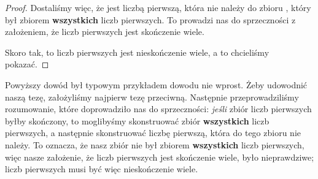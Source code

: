 \begin{example}
\begin{proof}
Dostaliśmy więc, że  jest liczbą pierwszą, która nie należy do zbioru , który był zbiorem \textbf{wszystkich} liczb pierwszych. To prowadzi nas do sprzeczności z założeniem, że liczb pierwszych jest skończenie wiele.

Skoro tak, to liczb pierwszych jest nieskończenie wiele, a to chcieliśmy pokazać.
\end{proof}

Powyższy dowód był typowym przykładem dowodu nie wprost. Żeby udowodnić naszą tezę, założyliśmy najpierw tezę przeciwną. Następnie przeprowadziliśmy rozumowanie, które doprowadziło nas do sprzeczności: \textit{jeśli} zbiór liczb pierwszych byłby skończony, to moglibyśmy skonstruować zbiór  \textbf{wszystkich} liczb pierwszych, a następnie skonstruować liczbę pierwszą, która do tego zbioru nie należy. To oznacza, że nasz zbiór  nie był zbiorem \textbf{wszystkich} liczb pierwszych, więc nasze założenie, że liczb pierwszych jest skończenie wiele, było nieprawdziwe; liczb pierwszych musi być więc nieskończenie wiele.

\end{example}

